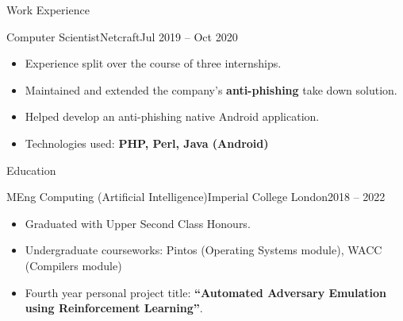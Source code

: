 \documentclass[a4paper]{mcdowellcv}
\begin{document}
\begin{cvsection}{Work Experience}
	\begin{cvsubsection}{Computer Scientist}{Netcraft}{Jul 2019 -- Oct 2020}
		\begin{itemize}
			\item Experience split over the course of three internships.
			\item Maintained and extended the company's \textbf{anti-phishing} take down solution.
			\item Helped develop an anti-phishing native Android application.
			\item Technologies used: \textbf{PHP, Perl, Java (Android)}
		\end{itemize}
	\end{cvsubsection}

\end{cvsection}

\begin{cvsection}{Education}

	\begin{cvsubsection}{MEng Computing (Artificial Intelligence)}{Imperial College London}{2018 -- 2022}
		\begin{itemize}
			\item Graduated with Upper Second Class Honours.
			\item Undergraduate courseworks: Pintos (Operating Systems module), WACC (Compilers module)
			\item Fourth year personal project title: \textbf{``Automated Adversary Emulation using Reinforcement Learning''}.
		\end{itemize}
	\end{cvsubsection}

\end{cvsection}
\end{document}
